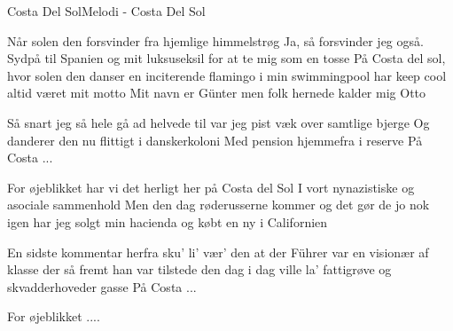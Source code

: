 \begin{sang}{Costa Del Sol}{Melodi - Costa Del Sol}
\begin{vers}
Når solen den forsvinder
fra hjemlige himmelstrøg
Ja, så forsvinder jeg også.
Sydpå til Spanien og mit luksuseksil
for at te mig som en tosse
På Costa del sol, hvor solen den danser
en inciterende flamingo i min swimmingpool
har keep cool altid været mit motto
Mit navn er Günter
men folk hernede kalder mig Otto
\end{vers}
\begin{vers}
Så snart jeg så hele gå ad helvede til
var jeg pist væk over samtlige bjerge
Og danderer den nu
flittigt i danskerkoloni
Med pension hjemmefra i reserve
På Costa ...
\end{vers}
\vbox{}\vfill
\begin{vers}
For øjeblikket har vi det herligt
her på Costa del Sol
I vort nynazistiske
og asociale sammenhold
Men den dag røderusserne kommer
og det gør de jo nok igen
har jeg solgt min hacienda
og købt en ny i Californien
\end{vers}
\begin{vers}
En sidste kommentar herfra
sku' li' vær' den
at der Führer var en visionær af klasse
der så fremt han var tilstede
den dag i dag
ville la' fattigrøve
og skvadderhoveder gasse
På Costa ...
\end{vers}
\begin{vers}
For øjeblikket ....
\end{vers}
\laps
\end{sang}
